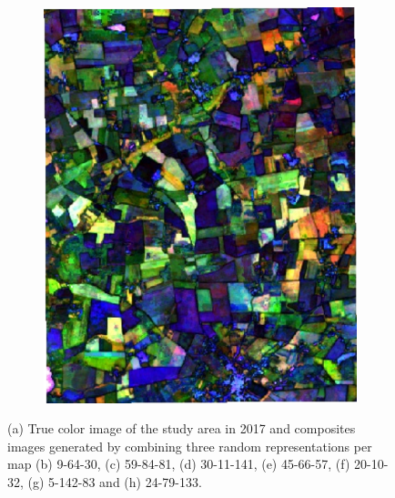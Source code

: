 \documentclass[journal,article,submit,pdftex,moreauthors]{Definitions/mdpi}
\providecommand{\DIFaddbeginFL}{} %
\providecommand{\DIFaddendFL}{} %
\providecommand{\DIFdelendFL}{} %
\begin{document}
\begin{figure}[H]
\begin{subfigure}[t]{0.23\linewidth}
\DIFdelendFL \DIFaddbeginFL \includegraphics[width=0.95\linewidth]{figures/aes_1_layer_mse_results/composites/composite_image_2479133.pdf}
    \DIFaddendFL \caption{}
	\label{fig:color_map_h}
	\end{subfigure}
	\caption{(a) True color image of the study area in 2017 and composites images generated by combining three random representations per map (b) 9-64-30, (c) 59-84-81, (d) 30-11-141, (e) 45-66-57, (f) 20-10-32, (g) 5-142-83 and (h) 24-79-133.}
	\label{color_maps}
\end{figure}
\end{document}

